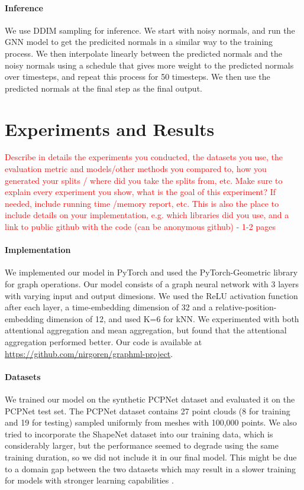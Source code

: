 \documentclass{acmart}
\newcommand{\instructions}[1]{\textcolor{red}{#1}\newline}
\begin{document}
\paragraph{Inference}
We use DDIM sampling \cite{song2020denoising} for inference. We start with noisy normals, and run the GNN model to get the predicited normals in a similar way to the training process. We then interpolate linearly between the predicted normals and the noisy normals using a schedule that gives more weight to the predicted normals over timesteps, and repeat this process for 50 timesteps. We then use the predicted normals at the final step as the final output.

\section{Experiments and Results}
\instructions{Describe in details the experiments you conducted, the datasets you use, the evaluation metric and models/other methods you compared to, how you generated your splits / where did you take the splits from, etc. Make sure to explain every experiment you show, what is the goal of this experiment? If needed, include running time /memory report, etc.
This is also the place to include details on your implementation, e.g. which libraries did you use, and a link to public github with the code (can be anonymous github) - 1-2 pages}

\paragraph{Implementation}
We implemented our model in PyTorch and used the PyTorch-Geometric library for graph operations. Our model consists of a graph neural network with 3 layers with varying input and output dimesions. We used the ReLU activation function after each layer, a time-embedding dimension of 32 and a relative-position-embedding dimension of 12, and used K=6 for kNN. We experimented with both attentional aggregation and mean aggregation, but found that the attentional aggregation performed better. Our code is available at \url{https://github.com/nirgoren/graphml-project}.

\paragraph{Datasets}
We trained our model on the synthetic PCPNet dataset \cite{guerrero2018pcpnet} and evaluated it on the PCPNet test set. The PCPNet dataset contains 27 point clouds (8 for training and 19 for testing) sampled uniformly from meshes with 100,000 points. We also tried to incorporate the ShapeNet dataset \cite{shapenet2015} into our training data, which is considerably larger, but the performance seemed to degrade using the same training duration, so we did not include it in our final model. This might be due to a domain gap between the two datasets which may result in a slower training for models with stronger learning capabilities \cite{jin2024asymmetrical}.
\end{document}
